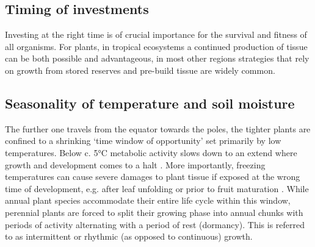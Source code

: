 \documentclass{article}
\begin{document}
	\subsection*{Timing of investments} %
		Investing at the right time is of crucial importance for the survival and fitness of all organisms. For plants, in tropical ecosystems a continued production of tissue can be both possible and advantageous, in most other regions strategies that rely on growth from stored reserves and pre-build tissue are widely common. %

	\subsection*{Seasonality of temperature and soil moisture}
		The further one travels from the equator towards the poles, the tighter plants are confined to a shrinking ‘time window of opportunity’ set primarily by low temperatures. Below c. 5°C  metabolic activity slows down to an extend where growth and development comes to a halt \citep{schenkerPhysiologicalMinimumTemperatures2014, rossiCriticalTemperaturesXylogenesis2008, kornerWinterCropGrowth2008}. More importantly, freezing temperatures can cause severe damages to plant tissue if exposed at the wrong time of development, e.g. after leaf unfolding or prior to fruit maturation \citep{baumgartenNoRiskNo2023a}. %
		While annual plant species accommodate their entire life cycle within this window, perennial plants are forced to split their growing phase into annual chunks with periods of activity alternating with a period of rest (dormancy). This is referred to as intermittent or rhythmic (as opposed to continuous) growth. \\
\end{document}
